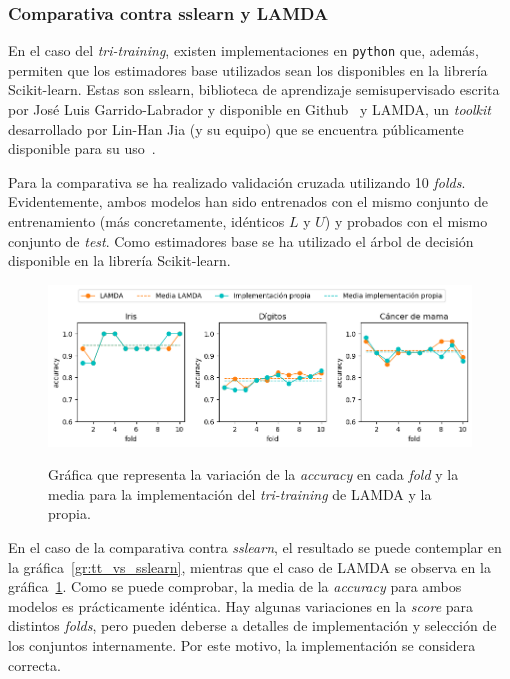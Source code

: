 \subsubsection{Comparativa contra sslearn y LAMDA}

En el caso del \textit{tri-training}, existen implementaciones en \texttt{python} que, además, permiten que los estimadores base utilizados sean los disponibles en la librería Scikit-learn. Estas son sslearn, biblioteca de aprendizaje semisupervisado escrita por José Luis Garrido-Labrador y disponible en Github~\cite{sslearnRepo} y LAMDA, un \textit{toolkit}~\cite{lamdasslPaper} desarrollado por Lin-Han Jia (y su equipo) que se encuentra públicamente disponible para su uso~\cite{lamdasslRepo}.

Para la comparativa se ha realizado validación cruzada utilizando 10 \textit{folds}. Evidentemente, ambos modelos han sido entrenados con el mismo conjunto de entrenamiento (más concretamente, idénticos $L$ y $U$) y probados con el mismo conjunto de \textit{test}. Como estimadores base se ha utilizado el árbol de decisión disponible en la librería Scikit-learn.

\begin{figure}[h]
	\caption[\textit{Tri-training}: comparativa contra LAMDA]{Gráfica que representa la variación de la \textit{accuracy} en cada \textit{fold} y la media para la implementación del \textit{tri-training} de LAMDA y la propia.}
	\centering
	\includegraphics[scale=0.62]{../img/memoria/5_tritraining_lamda}
	\label{gr:tt_vs_lamda}
\end{figure}

En el caso de la comparativa contra \textit{sslearn}, el resultado se puede contemplar en la gráfica~\ref{gr:tt_vs_sslearn}, mientras que el caso de LAMDA se observa en la gráfica~\ref{gr:tt_vs_lamda}. Como se puede comprobar, la media de la \textit{accuracy} para ambos modelos es prácticamente idéntica. Hay algunas variaciones en la \textit{score} para distintos \textit{folds}, pero pueden deberse a detalles de implementación y selección de los conjuntos internamente. Por este motivo, la implementación se considera correcta.

